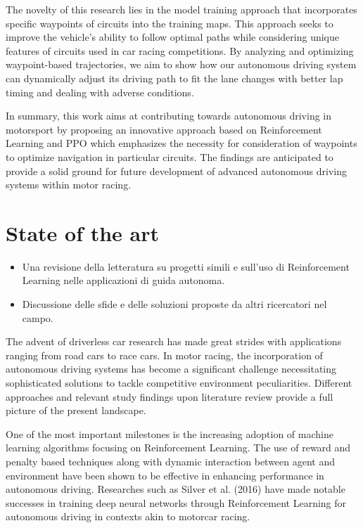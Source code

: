 \documentclass[conference]{IEEEtran}
\begin{document}
The novelty of this research lies in the model training approach that incorporates specific waypoints of circuits into the training maps. This approach seeks to improve the vehicle’s ability to follow optimal paths while considering unique features of circuits used in car racing competitions. By analyzing and optimizing waypoint-based trajectories, we aim to show how our autonomous driving system can dynamically adjust its driving path to fit the lane changes with better lap timing and dealing with adverse conditions.

In summary, this work aims at contributing towards autonomous driving in motorsport by proposing an innovative approach based on Reinforcement Learning and PPO which emphasizes the necessity for consideration of waypoints to optimize navigation in particular circuits. The findings are anticipated to provide a solid ground for future development of advanced autonomous driving systems within motor racing.


\section{State of the art}

\begin{itemize}
    \item Una revisione della letteratura su progetti simili e sull'uso di Reinforcement Learning nelle applicazioni di guida autonoma.

    \item Discussione delle sfide e delle soluzioni proposte da altri ricercatori nel campo.

\end{itemize}

The advent of driverless car research has made great strides with applications ranging from road cars to race cars. In motor racing, the incorporation of autonomous driving systems has become a significant challenge necessitating sophisticated solutions to tackle competitive environment peculiarities. Different approaches and relevant study findings upon literature review provide a full picture of the present landscape.

One of the most important milestones is the increasing adoption of machine learning algorithms focusing on Reinforcement Learning. The use of reward and penalty based techniques along with dynamic interaction between agent and environment have been shown to be effective in enhancing performance in autonomous driving. Researches such as Silver et al. (2016) \cite{first} have made notable successes in training deep neural networks through Reinforcement Learning for autonomous driving in contexts akin to motorcar racing.
\end{document}
